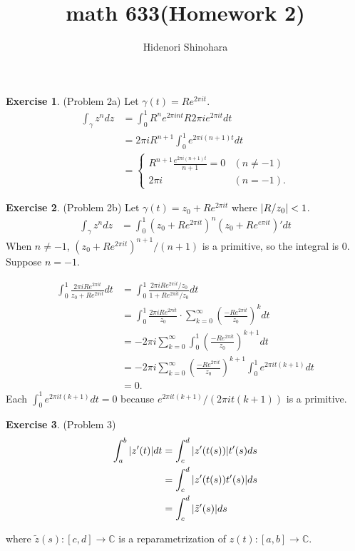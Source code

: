 \documentclass[12pt, psamsfonts]{amsart}
\theoremstyle{definition}
\newtheorem*{exer}{Exercise}
\theoremstyle{remark}
\numberwithin{equation}{section}
\begin{document}
\title{math 633(Homework 2)}
\author{Hidenori Shinohara}
\maketitle

\begin{exer}{(Problem 2a)}
  Let $\gamma(t) = Re^{2\pi it}$.
  \begin{align*}
    \int_{\gamma} z^ndz
      &= \int_{0}^{1} R^ne^{2\pi i nt}R2\pi ie^{2\pi it} dt \\
      &= 2\pi i R^{n + 1}\int_{0}^{1} e^{2\pi i (n + 1)t} dt \\
      &= \begin{cases}
        R^{n + 1} \frac{e^{2\pi i(n + 1)t}}{n + 1} = 0 & (n \ne -1) \\
        2\pi i & (n = -1).
      \end{cases}
  \end{align*}
\end{exer}

\begin{exer}{(Problem 2b)}
  Let $\gamma(t) = z_0 + Re^{2\pi it}$ where $\abs{R / z_0} < 1$.
  \begin{align*}
    \int_{\gamma} z^ndz
      &= \int_{0}^{1} (z_0 + Re^{2\pi it})^n(z_0 + Re^{e\pi it})' dt
  \end{align*}
  When $n \ne -1$, $(z_0 + Re^{2\pi it})^{n + 1} / (n + 1)$ is a primitive, so the integral is 0.
  Suppose $n = -1$.

  \begin{align*}
    \int_{0}^{1} \frac{2 \pi i Re^{2\pi it}}{z_0 + Re^{2\pi i t}} dt
      &= \int_{0}^{1} \frac{2 \pi i Re^{2\pi it} / z_0}{1 + Re^{2\pi i t} / z_0} dt \\
      &= \int_{0}^{1} \frac{2\pi i Re^{2\pi it}}{z_0} \cdot \sum_{k=0}^{\infty} (\frac{-Re^{2\pi it}}{z_0})^kdt \\
      &= -2\pi i\sum_{k=0}^{\infty} \int_0^1 (\frac{-Re^{2\pi it}}{z_0})^{k + 1} dt \\
      &= -2\pi i\sum_{k=0}^{\infty} (\frac{-Re^{2\pi it}}{z_0})^{k + 1}\int_0^1 e^{2\pi i t(k + 1)} dt \\
      &= 0.
  \end{align*}
  Each $\int_0^1 e^{2\pi i t(k + 1)} dt = 0$ because $e^{2\pi it(k + 1)} / (2\pi i t(k + 1))$ is a primitive.
\end{exer}

\begin{exer}{(Problem 3)}
  \begin{align*}
    \int_a^b \abs{z'(t)} dt
      &= \int_c^d \abs{z'(t(s))}t'(s) ds \\
      &= \int_c^d \abs{z'(t(s))t'(s)} ds \\
      &= \int_c^d \abs{\tilde{z}'(s)} ds
  \end{align*}
  
  where $\tilde{z}(s): [c, d] \rightarrow \mathbb{C}$ is a reparametrization of $z(t): [a, b] \rightarrow \mathbb{C}$.
\end{exer}
\end{document}
